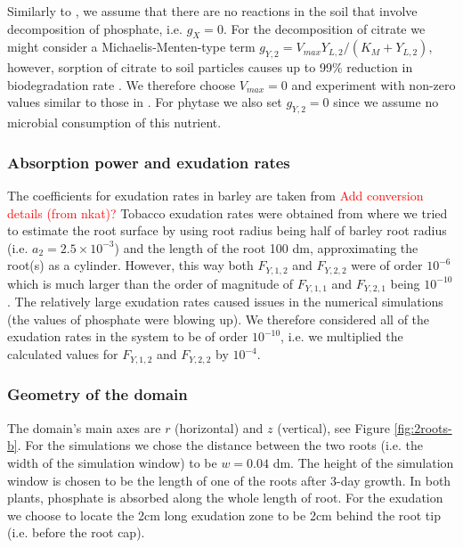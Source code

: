 \documentclass[11pt]{article}
\numberwithin{equation}{section}
\begin{document}
Similarly to \cite{Ptashnyk-2011}, we assume that there are no reactions in the soil that involve decomposition of phosphate, i.e. $g_X = 0$. For the decomposition of citrate we might consider a Michaelis-Menten-type term $g_{Y,2} = V_{max} Y_{L,2} / (K_M + Y_{L,2})$, however, sorption of citrate to soil particles causes up to 99\% reduction in biodegradation rate \cite{McKayFletcher-2019}. We therefore choose $V_{max} = 0$ and experiment with non-zero values similar to those in \cite{Ptashnyk-2011}. For phytase we also set $g_{Y,2} = 0$ since we assume no microbial consumption of this nutrient.

\subsubsection{Absorption power and exudation rates}
The coefficients for exudation rates in barley are taken from \cite{Ruiz-2020} \textcolor{red}{Add conversion details (from nkat)?} Tobacco exudation rates were obtained from \cite{giles_george} where we tried to estimate the root surface by using root radius being half of barley root radius (i.e. $a_2 = 2.5 \times 10^{-3}$) and the length of the root 100 dm, approximating the root(s) as a cylinder. However, this way both $F_{Y,1,2}$ and $F_{Y,2,2}$ were of order $10^{-6}$ which is much larger than the order of magnitude of $F_{Y,1,1}$ and $F_{Y,2,1}$ being $10^{-10}$. The relatively large exudation rates caused issues in the numerical simulations (the values of phosphate were blowing up). We therefore considered all of the exudation rates in the system to be of order $10^{-10}$, i.e. we multiplied the calculated values for $F_{Y,1,2}$ and $F_{Y,2,2}$ by $10^{-4}$.

\subsubsection{Geometry of the domain}
The domain's main axes are $r$ (horizontal) and $z$ (vertical), see Figure \ref{fig:2roots-b}. For the simulations we chose the distance between the two roots (i.e. the width of the simulation window) to be $w = 0.04$ dm. The height of the simulation window is chosen to be the length of one of the roots after 3-day growth. In both plants, phosphate is absorbed along the whole length of root. For the exudation we choose to locate the 2cm long exudation zone to be 2cm behind the root tip (i.e. before the root cap).
\end{document}
